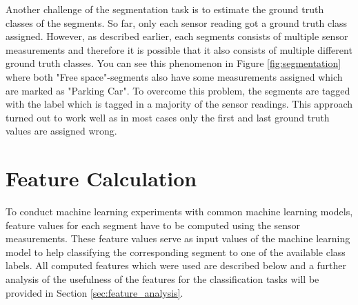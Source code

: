 Another challenge of the segmentation task is to estimate the ground truth classes of the segments. So far, only each sensor reading got a ground truth class assigned. However, as described earlier, each segments consists of multiple sensor measurements and therefore it is possible that it also consists of multiple different ground truth classes. You can see this phenomenon in Figure \ref{fig:segmentation} where both "Free space"-segments also have some measurements assigned which are marked as "Parking Car". To overcome this problem, the segments are tagged with the label which is tagged in a majority of the sensor readings. This approach turned out to work well as in most cases only the first and last ground truth values are assigned wrong. 




\section{Feature Calculation}
\label{sec:feature_calculation}

To conduct machine learning experiments with common machine learning models, feature values for each segment have to be computed using the sensor measurements. These feature values serve as input values of the machine learning model to help classifying the corresponding segment to one of the available class labels. All computed features which were used are described below and a further analysis of the usefulness of the features for the classification tasks will be provided in Section \ref{sec:feature_analysis}.

